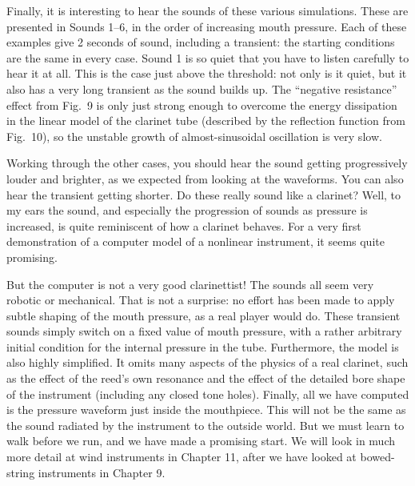   Finally, it is interesting to hear the sounds of these various simulations. 
  These are presented in Sounds 1--6, in the order of increasing mouth 
  pressure. Each of these examples give 2 seconds of sound, including a 
  transient: the starting conditions are the same in every case. Sound 1 is so 
  quiet that you have to listen carefully to hear it at all. This is the case 
  just above the threshold: not only is it quiet, but it also has a very long 
  transient as the sound builds up. The ``negative resistance'' effect from 
  Fig.\ 9 is only just strong enough to overcome the energy dissipation in the 
  linear model of the clarinet tube (described by the reflection function from 
  Fig.\ 10), so the unstable growth of almost-sinusoidal oscillation is very 
  slow. 

\audio{}

\audio{}

\audio{}

\audio{}

\audio{}

\audio{}

  Working through the other cases, you should hear the sound getting 
  progressively louder and brighter, as we expected from looking at the 
  waveforms. You can also hear the transient getting shorter. Do these really 
  sound like a clarinet? Well, to my ears the sound, and especially the 
  progression of sounds as pressure is increased, is quite reminiscent of how a 
  clarinet behaves. For a very first demonstration of a computer model of a 
  nonlinear instrument, it seems quite promising. 

  But the computer is not a very good clarinettist! The sounds all seem very 
  robotic or mechanical. That is not a surprise: no effort has been made to 
  apply subtle shaping of the mouth pressure, as a real player would do. These 
  transient sounds simply switch on a fixed value of mouth pressure, with a 
  rather arbitrary initial condition for the internal pressure in the tube. 
  Furthermore, the model is also highly simplified. It omits many aspects of 
  the physics of a real clarinet, such as the effect of the reed's own 
  resonance and the effect of the detailed bore shape of the instrument 
  (including any closed tone holes). Finally, all we have computed is the 
  pressure waveform just inside the mouthpiece. This will not be the same as 
  the sound radiated by the instrument to the outside world. But we must learn 
  to walk before we run, and we have made a promising start. We will look in 
  much more detail at wind instruments in Chapter 11, after we have looked at 
  bowed-string instruments in Chapter 9. 

